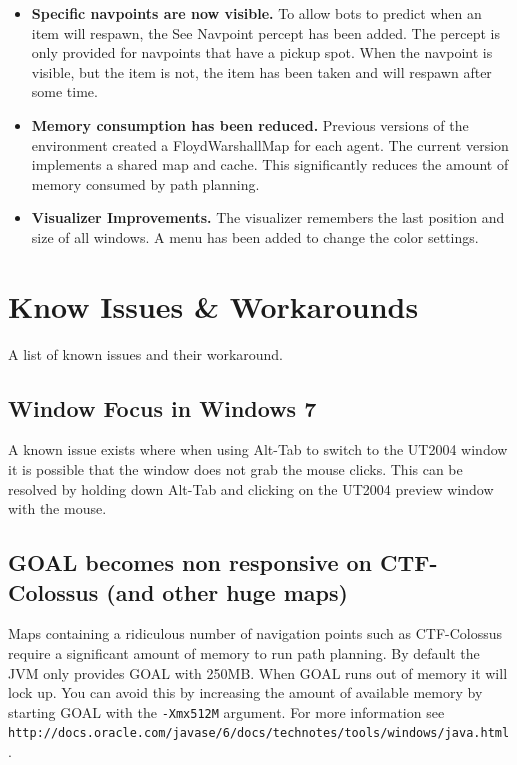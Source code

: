 \documentclass[11pt,a4paper]{article}
\begin{document}
\begin{itemize}
	\item \textbf{Specific navpoints are now visible.} To allow bots to predict when an item will respawn, the See Navpoint percept has been added. The percept is only provided for navpoints that have a pickup spot. When the navpoint is visible, but the item is not, the item has been taken and will respawn after some time.

	\item \textbf{Memory consumption has been reduced.}  Previous versions of the environment created a FloydWarshallMap for each agent. The current version implements a shared map and cache. This significantly reduces the amount of memory consumed by path planning.
	
	\item \textbf{Visualizer Improvements.}  The visualizer remembers the last position and size of all windows. A menu has been added to change the color settings.

\end{itemize}


\section{Know Issues \& Workarounds}

A list of known issues and their workaround.

\subsection{Window Focus in Windows 7}

A known issue exists where when using Alt-Tab to switch to the UT2004 window it is possible that the window does not grab the mouse clicks. This can be resolved by holding down Alt-Tab and clicking on the UT2004 preview window with the mouse.

\subsection{GOAL becomes non responsive on CTF-Colossus (and other huge maps)}

Maps containing a ridiculous number of navigation points such as CTF-Colossus require a significant amount of memory to run path planning. By default the JVM only provides GOAL with 250MB. When GOAL runs out of memory it will lock up. You can avoid this by increasing the amount of available memory  by starting GOAL with the \texttt{-Xmx512M} argument. For more information see \texttt{http://docs.oracle.com/javase/6/docs/technotes/tools/windows/java.html }.
\end{document}

